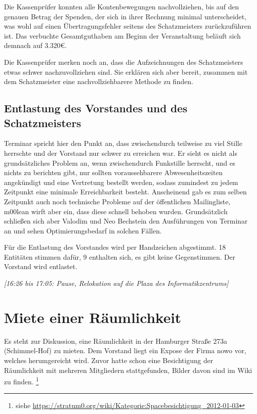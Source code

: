 \documentclass[a4paper,12pt]{scrartcl}
\begin{document}
Die Kassenprüfer konnten alle Kontenbewegungen nachvollziehen, bis auf den
genauen Betrag der Spenden, der sich in ihrer Rechnung minimal unterscheidet,
was wohl auf einen Übertragungsfehler seitens des Schatzmeisters zurückzuführen
ist. Das verbuchte Gesamtguthaben am Beginn der Veranstaltung beläuft sich
demnach auf 3{.}320€.

Die Kassenprüfer merken noch an, dass die Aufzeichnungen des Schatzmeisters
etwas schwer nachzuvollziehen sind. Sie erklären sich aber bereit, zusammen
mit dem Schatzmeister eine nachvollziehbarere Methode zu finden.

\subsection{Entlastung des Vorstandes und des Schatzmeisters}
Terminar spricht hier den Punkt an, dass zwischendurch teilweise zu viel Stille
herrschte und der Vorstand nur schwer zu erreichen war. Er sieht es nicht als
grundsätzliches Problem an, wenn zwischendurch Funkstille herrscht, und es
nichts zu berichten gibt, nur sollten voraussehbarere Abwesenheitszeiten
angekündigt und eine Vertretung bestellt werden, sodass zumindest zu jedem
Zeitpunkt eine minimale Erreichbarkeit besteht. Anscheinend gab es zum selben
Zeitpunkt auch noch technische Probleme auf der öffentlichen Mailingliste,
m00lean wirft aber ein, dass diese schnell behoben wurden. Grundsätzlich
schließen sich aber Valodim und Neo Bechstein den Ausführungen von Terminar
an und sehen Optimierungsbedarf in solchen Fällen.

Für die Entlastung des Vorstandes wird per Handzeichen abgestimmt. 18 Entitäten
stimmen dafür, 9 enthalten sich, es gibt keine Gegenstimmen. Der Vorstand wird
entlastet.

\emph{[16:26 bis 17:05: Pause, Relokation auf die Plaza des Informatikzentrums]}

\section{Miete einer Räumlichkeit}
\label{top:space}
Es steht zur Diskussion, eine Räumlichkeit in der Hamburger Straße 273a
(Schimmel-Hof) zu mieten. Dem Vorstand liegt ein Expose der Firma nowo vor,
welches herumgereicht wird. Zuvor hatte schon eine Besichtigung der Räumlichkeit
mit mehreren Mitgliedern stattgefunden, Bilder davon sind im Wiki zu finden.%
\footnote{siehe
\url{https://stratum0.org/wiki/Kategorie:Spacebesichtigung_2012-01-03}}
\end{document}
